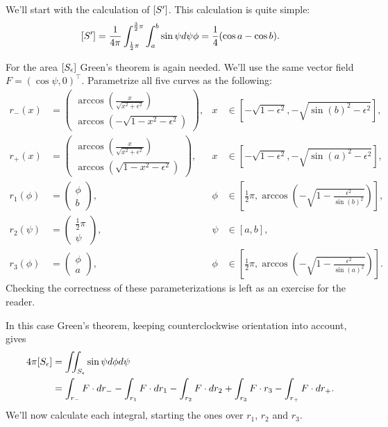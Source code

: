 \documentclass[twoside,a4paper]{article}
\theoremstyle{plain}
\theoremstyle{definition}
\theoremstyle{remark}
\numberwithin{equation}{section}
\let\P\relax
\DeclareMathOperator{\P}{\mathbb{P}}
\DeclareMathOperator{\1}{\mathbbm{1}}
\begin{document}
We'll start with the calculation of $\P[S']$. This calculation is quite simple:
\[\P[S']=\frac{1}{4\pi}\int_{\frac{1}{2}\pi}^{\frac{3}{2}\pi}\int_a^b\sin\psi d\psi \phi=\frac{1}{4}(\cos a-\cos b).\]

For the area $\P[S_\epsilon]$ Green's theorem is again needed. We'll use the same vector field $F=(\cos\psi,0)^\top$. Parametrize all five curves as the following:
\begin{align*}
r_-(x)&=\begin{pmatrix}
\arccos\left(\frac{x}{\sqrt{x^2+\epsilon^2}}\right)\\
\arccos\left(-\sqrt{1-x^2-\epsilon^2}\right)
\end{pmatrix},&x&\in\left[-\sqrt{1-\epsilon^2},-\sqrt{\sin(b)^2-\epsilon^2}\right],\\
r_+(x)&=\begin{pmatrix}
\arccos\left(\frac{x}{\sqrt{x^2+\epsilon^2}}\right)\\
\arccos\left(\sqrt{1-x^2-\epsilon^2}\right)
\end{pmatrix},&x&\in\left[-\sqrt{1-\epsilon^2},-\sqrt{\sin(a)^2-\epsilon^2}\right],\\
r_1(\phi)&=\begin{pmatrix}\phi\\b\end{pmatrix},&\phi&\in\left[\frac{1}{2}\pi,\arccos\left(-\sqrt{1-\frac{\epsilon^2}{\sin(b)^2}}\right)\right],\\
r_2(\psi)&=\begin{pmatrix}\frac{1}{2}\pi\\\psi\end{pmatrix},&\psi&\in[a,b],\\
r_3(\phi)&=\begin{pmatrix}\phi\\a\end{pmatrix},&\phi&\in\left[\frac{1}{2}\pi,\arccos\left(-\sqrt{1-\frac{\epsilon^2}{\sin(a)^2}}\right)\right].
\end{align*}
Checking the correctness of these parameterizations is left as an exercise for the reader.

In this case Green's theorem, keeping counterclockwise orientation into account, gives
\begin{align*}
4\pi\P[S_\epsilon]&=\iint_{S_\epsilon}\sin\psi d\phi d\psi\\
&=\int_{r_-}F\cdot dr_- -\int_{r_1} F\cdot dr_1-\int_{r_2}F\cdot dr_2+\int_{r_3}F\cdot r_3-\int_{r_+}F\cdot dr_+.
\end{align*}
We'll now calculate each integral, starting the ones over $r_1$, $r_2$ and $r_3$.
\end{document}
